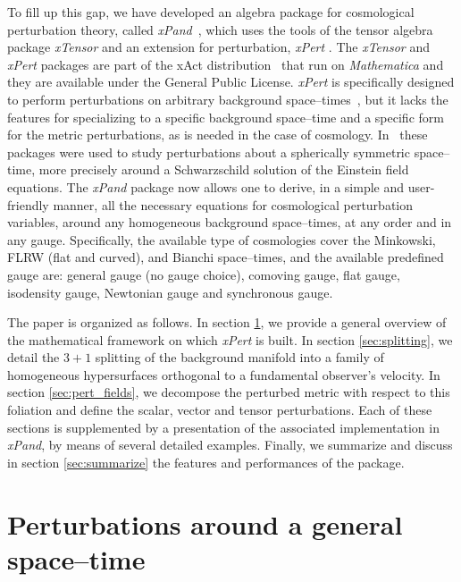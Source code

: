 \documentclass[notitlepage,onecolumn,floatfix,preprintnumbers,aps,prd,showpacs,nofootinbib,amsmath,amssymb,amsfonts]{revtex4-1}
\newcommand{\<}{\langle}
\renewcommand{\>}{\rangle}
\newcommand{\xPert}{{\em \lowercase{x}P\lowercase{ert}}}
\begin{document}
To fill up this gap, we have developed an algebra package for cosmological perturbation theory, called 
\textit{xPand}~\cite{xPand}, which uses the tools of the tensor
algebra package \textit{xTensor} and an extension for perturbation,
\textit{xPert} \cite{xAct,Brizuela:2008ra}. The {\it xTensor} and
{\xPert} packages are part of the xAct distribution~\cite{xAct} that run on
{\it Mathematica} and
they are available under the General Public License. \textit{xPert} is specifically designed to perform perturbations on arbitrary background 
space--times~\cite{Brizuela:2006ne,Brizuela:2008ra}, but it lacks the
features for specializing to a specific 
background space--time and a specific form for the metric perturbations, as is needed in the case of cosmology. 
In~\cite{Brizuela:2009qd,Brizuela:2010qu} these packages were used to study perturbations about a spherically 
symmetric space--time, more precisely around a Schwarzschild solution of the Einstein field equations.  
%
The \textit{xPand} package now allows one to derive, in a simple and user-friendly manner, all the necessary 
equations for cosmological perturbation variables, around any homogeneous background space--times, at any 
order and in any gauge. Specifically, the available type of cosmologies cover the Minkowski, FLRW (flat and curved), 
and Bianchi space--times, and the available predefined gauge are: general gauge (no gauge choice), comoving gauge, 
flat gauge, isodensity gauge, Newtonian gauge and synchronous gauge. 

The paper is organized as follows. In section \ref{sec:review_xPert}, we provide a general overview of the mathematical 
framework on which {\xPert } is built. In section \ref{sec:splitting}, we detail the $3+1$ splitting of the background 
manifold into a family of homogeneous hypersurfaces orthogonal to a fundamental observer's velocity. 
In section \ref{sec:pert_fields}, we decompose the perturbed metric with respect to this foliation and define the scalar, vector 
and tensor perturbations. Each of these sections is supplemented by a presentation of the associated implementation in 
\textit{xPand}, by means of several detailed examples. Finally, we summarize and discuss in section \ref{sec:summarize} 
the features and performances of the package. 


\section{Perturbations around a general space--time} \label{sec:review_xPert}
\end{document}
